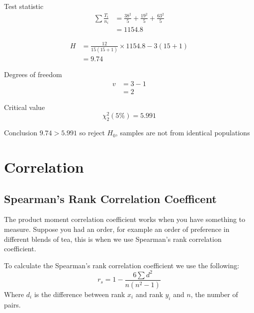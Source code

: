 \begin{example}
\begin{step}{Test statistic}
        \begin{align*}
        \sum\frac{T_i}{n_i} &= \frac{38^2}{5} + \frac{19^2}{5} + \frac{63^2}{5}\\
        &= 1154.8
        \end{align*}

        \begin{align*}
        H &= \frac{12}{15(15 + 1)} \times 1154.8 - 3(15 + 1)\\
        &= 9.74
        \end{align*}
        \end{step}

        \begin{step}{Degrees of freedom}
        \begin{align*}
        v &= 3 - 1 \\
          &= 2
        \end{align*}
        \end{step}

        \begin{step}{Critical value}
        $$
        \chi^2_2(5\%) = 5.991
        $$
        \end{step}
        
        \begin{step}{Conclusion}
        $9.74 > 5.991$ so reject $H_0$, samples are not from identical populations
        \end{step}
        \end{example}

\newpage
\section{Correlation}
    \newpage
    \subsection{Spearman's Rank Correlation Coefficent}

        The product moment correlation coefficient works when you have something to measure. Suppose you had an order, for example an order of preference in different blends of tea, this is when we use Spearman's rank correlation coefficient.

        To calculate the Spearman's rank correlation coefficient we use the following:
        $$
        r_s = 1 - \frac{6\sum{d^2}}{n(n^2-1)}
        $$
        Where $d_i$ is the difference between rank $x_i$ and rank $y_i$ and $n$, the number of pairs.

